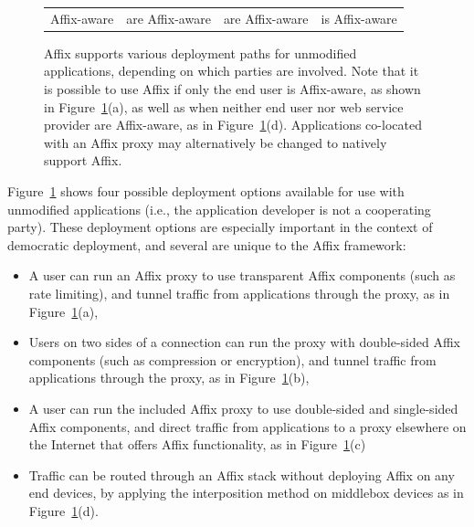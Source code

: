 \begin{figure}[t]
\begin{tabular}{c c c c}
  Affix-aware  \hspace{.05cm} & are Affix-aware \hspace{.05cm} &  are Affix-aware \hspace{.05cm} &  is Affix-aware
\end{tabular}
  \caption{Affix supports various deployment paths for unmodified applications, depending on which parties are involved. Note that it is possible to use Affix if only the end user is 
  Affix-aware, as shown in Figure~\ref{affix-deployment}(a), 
  as well as when neither end user nor web service provider are Affix-aware, 
  as in Figure~\ref{affix-deployment}(d).   Applications co-located with
an Affix proxy may alternatively be changed to natively support Affix.}
  \label{affix-deployment}
\end{figure}


Figure~\ref{affix-deployment} shows four possible deployment 
options available for use with unmodified applications
(i.e., the application developer is not a cooperating party). 
These deployment options are especially 
important in the context of democratic deployment, 
and several are unique to the Affix framework:

\begin{itemize}
    \item A user can run an Affix proxy to use transparent 
Affix components (such as rate limiting), and tunnel traffic from applications 
through the proxy, as in Figure~\ref{affix-deployment}(a),
    \item Users on two sides of a connection can run the 
proxy with double-sided Affix components (such as compression or encryption),
and tunnel traffic from applications through the proxy, as in Figure~\ref{affix-deployment}(b),
    \item A user can run the included Affix proxy to use double-sided and single-sided
Affix components, and direct traffic from applications to a proxy elsewhere on 
the Internet that offers Affix functionality, as in Figure~\ref{affix-deployment}(c)
    \item Traffic can be routed through an Affix stack without deploying 
    Affix on any end devices, by applying the interposition 
method on middlebox devices as in Figure~\ref{affix-deployment}(d).
\end{itemize}
